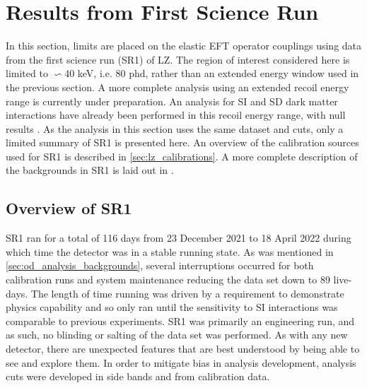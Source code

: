 \section{Results from First Science Run}
\par
In this section, limits are placed on the elastic EFT operator couplings using data from the first science run (SR1) of LZ.
The region of interest considered here is limited to $\backsim$40 keV, i.e. 80 phd, rather than an extended energy window used in the previous section.
A more complete analysis using an extended recoil energy range is currently under preparation.
An analysis for SI and SD dark matter interactions have already been performed in this recoil energy range, with null results \cite{lz_ws_sr1_ref}.
As the analysis in this section uses the same dataset and cuts, only a limited summary of SR1 is presented here.
An overview of the calibration sources used for SR1 is described in \autoref{sec:lz_calibrations}.
A more complete description of the backgrounds in SR1 is laid out in \cite{lz_sr1_backgrounds_ref}.

\subsection{Overview of SR1}
\par
SR1 ran for a total of 116 days from 23 December 2021 to 18 April 2022 during which time the detector was in a stable running state.
As was mentioned in \autoref{sec:od_analysis_backgrounds}, several interruptions occurred for both calibration runs and system maintenance reducing the data set down to 89 live-days.
The length of time running was driven by a requirement to demonstrate physics capability and so only ran until the sensitivity to SI interactions was comparable to previous experiments.
SR1 was primarily an engineering run, and as such, no blinding or salting of the data set was performed.
As with any new detector, there are unexpected features that are best understood by being able to see and explore them.
In order to mitigate bias in analysis development, analysis cuts were developed in side bands and from calibration data.

